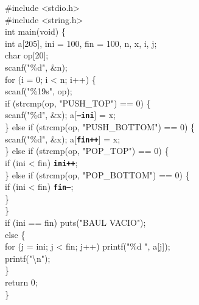 \documentclass[10pt, a4paper]{article}
\newcommand{\codigoResaltado}[1]{\colorbox{fondoresaltado}{\textbf{\color{verdecompletado}\texttt{#1}}}}
\begin{document}
\vspace{1.5mm}
\begin{tcolorbox}[colback=fondocodigo, colframe=azulborde, leftrule=2mm, arc=1mm, boxrule=0.5pt, top=1.5mm, bottom=1.5mm]
\small\ttfamily
\#include <stdio.h>\\
\#include <string.h>\\[1mm]
int main(void) \{\\
\hspace*{4mm}int a[205], ini = 100, fin = 100, n, x, i, j;\\
\hspace*{4mm}char op[20];\\
\hspace*{4mm}scanf("\%d", \&n);\\
\hspace*{4mm}for (i = 0; i < n; i++) \{\\
\hspace*{8mm}scanf("\%19s", op);\\
\hspace*{8mm}if (strcmp(op, "PUSH\_TOP") == 0) \{\\
\hspace*{12mm}scanf("\%d", \&x); a[\codigoResaltado{--ini}] = x;\\
\hspace*{8mm}\} else if (strcmp(op, "PUSH\_BOTTOM") == 0) \{\\
\hspace*{12mm}scanf("\%d", \&x); a[\codigoResaltado{fin++}] = x;\\
\hspace*{8mm}\} else if (strcmp(op, "POP\_TOP") == 0) \{\\
\hspace*{12mm}if (ini < fin) \codigoResaltado{ini++};\\
\hspace*{8mm}\} else if (strcmp(op, "POP\_BOTTOM") == 0) \{\\
\hspace*{12mm}if (ini < fin) \codigoResaltado{fin--};\\
\hspace*{8mm}\}\\
\hspace*{4mm}\}\\
\hspace*{4mm}if (ini == fin) puts("BAUL VACIO");\\
\hspace*{4mm}else \{\\
\hspace*{8mm}for (j = ini; j < fin; j++) printf("\%d ", a[j]);\\
\hspace*{8mm}printf("\textbackslash n");\\
\hspace*{4mm}\}\\
\hspace*{4mm}return 0;\\
\}
\end{tcolorbox}
\end{document}
